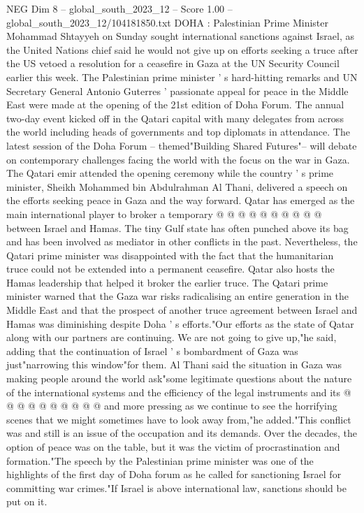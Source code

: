 \begin{textsample}{NEG Dim 8 – global\_south\_2023\_12 – Score 1.00 – global\_south\_2023\_12/104181850.txt}  \label{ex:f8_neg_228}
DOHA : Palestinian Prime Minister Mohammad Shtayyeh on Sunday sought international sanctions against Israel, as the United Nations chief said he would not give up on efforts seeking a truce after the US vetoed a resolution for a ceasefire in Gaza at the UN Security Council earlier this week.
The Palestinian prime minister ' s hard-hitting remarks and UN Secretary General Antonio Guterres ' passionate appeal for peace in the Middle East were made at the opening of the 21st edition of Doha Forum.
The annual two-day event kicked off in the Qatari capital with many delegates from across the world including heads of governments and top diplomats in attendance.
The latest session of the Doha Forum -- themed"Building Shared Futures"-- will debate on contemporary challenges facing the world with the focus on the war in Gaza.
The Qatari emir attended the opening ceremony while the country ' s prime minister, Sheikh Mohammed bin Abdulrahman Al Thani, delivered a speech on the efforts seeking peace in Gaza and the way forward.
Qatar has emerged as the main international player to broker a temporary @ @ @ @ @ @ @ @ @ @ between Israel and Hamas.
The tiny Gulf state has often punched above its bag and has been involved as mediator in other conflicts in the past.
Nevertheless, the Qatari prime minister was disappointed with the fact that the humanitarian truce could not be extended into a permanent ceasefire.
Qatar also hosts the Hamas leadership that helped it broker the earlier truce.
The Qatari prime minister warned that the Gaza war risks radicalising an entire generation in the Middle East and that the prospect of another truce agreement between Israel and Hamas was diminishing despite Doha ' s efforts."Our efforts as the state of Qatar along with our partners are continuing.
We are not going to give up,"he said, adding that the continuation of Israel ' s bombardment of Gaza was just"narrowing this window"for them.
Al Thani said the situation in Gaza was making people around the world ask"some legitimate questions about the nature of the international systems and the efficiency of the legal instruments and its @ @ @ @ @ @ @ @ @ @ and more pressing as we continue to see the horrifying scenes that we might sometimes have to look away from,"he added."This conflict was and still is an issue of the occupation and its demands.
Over the decades, the option of peace was on the table, but it was the victim of procrastination and formation."The speech by the Palestinian prime minister was one of the highlights of the first day of Doha forum as he called for sanctioning Israel for committing war crimes."If Israel is above international law, sanctions should be put on it.

\end{textsample}
